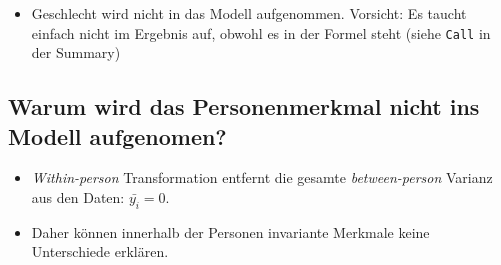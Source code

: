 \documentclass[
]{book}
\newenvironment{Shaded}{\begin{snugshade}}{\end{snugshade}}
\newcommand{\DataTypeTok}[1]{\textcolor[rgb]{0.13,0.29,0.53}{#1}}
\newcommand{\DecValTok}[1]{\textcolor[rgb]{0.00,0.00,0.81}{#1}}
\newcommand{\FloatTok}[1]{\textcolor[rgb]{0.00,0.00,0.81}{#1}}
\newcommand{\KeywordTok}[1]{\textcolor[rgb]{0.13,0.29,0.53}{\textbf{#1}}}
\newcommand{\NormalTok}[1]{#1}
\newcommand{\OperatorTok}[1]{\textcolor[rgb]{0.81,0.36,0.00}{\textbf{#1}}}
\newcommand{\OtherTok}[1]{\textcolor[rgb]{0.56,0.35,0.01}{#1}}
\newcommand{\StringTok}[1]{\textcolor[rgb]{0.31,0.60,0.02}{#1}}
\providecommand{\tightlist}{%
  \setlength{\itemsep}{0pt}\setlength{\parskip}{0pt}}
\begin{document}
\begin{itemize}
\tightlist
\item
  Geschlecht wird nicht in das Modell aufgenommen. Vorsicht: Es taucht einfach nicht im Ergebnis auf, obwohl es in der Formel steht (siehe \texttt{Call} in der Summary)
\end{itemize}

\hypertarget{warum-wird-das-personenmerkmal-nicht-ins-modell-aufgenomen}{%
\subsection*{Warum wird das Personenmerkmal nicht ins Modell aufgenomen?}\label{warum-wird-das-personenmerkmal-nicht-ins-modell-aufgenomen}}

\begin{itemize}
\tightlist
\item
  \emph{Within-person} Transformation entfernt die gesamte \emph{between-person} Varianz aus den Daten: \(\bar{y_{i}} = 0\).
\item
  Daher können innerhalb der Personen invariante Merkmale keine Unterschiede erklären.
\end{itemize}

\begin{Shaded}
\end{Shaded}
\end{document}
